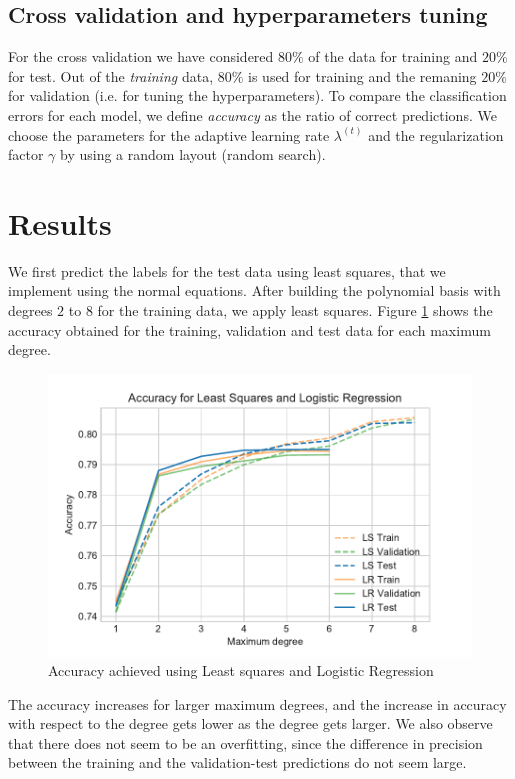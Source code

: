 \documentclass[10pt,conference,compsocconf]{IEEEtran}
\begin{document}
	\subsection{Cross validation and hyperparameters tuning} %
	\label{sub:cross_validation_and_hyperparameters_tuning}
  	For the cross validation we have considered $80\%$ of the data for training and $20\%$ for test. Out of the \emph{training} data, $80\%$ is used for training and the remaning $20\%$ for validation (i.e. for tuning the hyperparameters). To compare the classification errors for each model, we define \emph{accuracy} as the ratio of correct predictions.	We choose the parameters for the adaptive learning rate $\lambda^{(t)}$ and the regularization factor $\gamma$ by using a random layout (random search).

\section{Results}
\label{sec:results}
    We first predict the labels for the test data using least squares, that we implement using the normal equations. After building the polynomial basis with degrees $2$ to $8$ for the training data, we apply least squares. Figure \ref{fig:LSLRprec} shows the accuracy obtained for the training, validation and test data for each maximum degree.


    \begin{figure}[htp]
      \centering
      \includegraphics[width=.45\textwidth]{LSLRprec}
      \caption{Accuracy achieved using Least squares and Logistic Regression}
      \label{fig:LSLRprec}
    \end{figure}

    The accuracy increases for larger maximum degrees, and the increase in accuracy with respect to the degree gets lower as the degree gets larger. We also observe that there does not seem to be an overfitting, since the difference in precision between the training and the validation-test predictions do not seem large.
\end{document}
